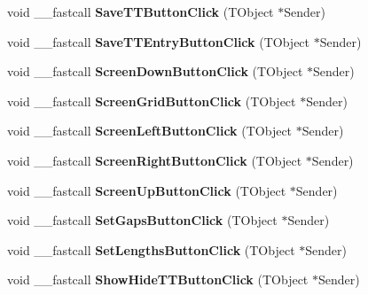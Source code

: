 \begin{DoxyCompactItemize}
\mbox{\label{class_t_interface_aa1135726a1c64c7b9b5436c81f1f7e97}} 
void \+\_\+\+\_\+fastcall {\bfseries Save\+T\+T\+Button\+Click} (T\+Object $\ast$Sender)
\item 
\mbox{\label{class_t_interface_a3cf355e15ec89570b79bd893ffbf0818}} 
void \+\_\+\+\_\+fastcall {\bfseries Save\+T\+T\+Entry\+Button\+Click} (T\+Object $\ast$Sender)
\item 
\mbox{\label{class_t_interface_ad53c136eca39fddb0e7e49a4b7018f66}} 
void \+\_\+\+\_\+fastcall {\bfseries Screen\+Down\+Button\+Click} (T\+Object $\ast$Sender)
\item 
\mbox{\label{class_t_interface_a05d882d712519bd79267e4ce5a52269c}} 
void \+\_\+\+\_\+fastcall {\bfseries Screen\+Grid\+Button\+Click} (T\+Object $\ast$Sender)
\item 
\mbox{\label{class_t_interface_a358ab18cab57f8a5b5b850387039f822}} 
void \+\_\+\+\_\+fastcall {\bfseries Screen\+Left\+Button\+Click} (T\+Object $\ast$Sender)
\item 
\mbox{\label{class_t_interface_aba3f772739d000bcbd8059181417a9b3}} 
void \+\_\+\+\_\+fastcall {\bfseries Screen\+Right\+Button\+Click} (T\+Object $\ast$Sender)
\item 
\mbox{\label{class_t_interface_a714f1498bb6cbbd706f6ed0882c4b03d}} 
void \+\_\+\+\_\+fastcall {\bfseries Screen\+Up\+Button\+Click} (T\+Object $\ast$Sender)
\item 
\mbox{\label{class_t_interface_a19148984e07e16178b6a6898bcbcdf22}} 
void \+\_\+\+\_\+fastcall {\bfseries Set\+Gaps\+Button\+Click} (T\+Object $\ast$Sender)
\item 
\mbox{\label{class_t_interface_a4b0c482229c19b856a8c3f07815e5d7d}} 
void \+\_\+\+\_\+fastcall {\bfseries Set\+Lengths\+Button\+Click} (T\+Object $\ast$Sender)
\item 
\mbox{\label{class_t_interface_ac53166b064fa3b3e1180ff50c51be74b}} 
void \+\_\+\+\_\+fastcall {\bfseries Show\+Hide\+T\+T\+Button\+Click} (T\+Object $\ast$Sender)

\end{DoxyCompactItemize}
